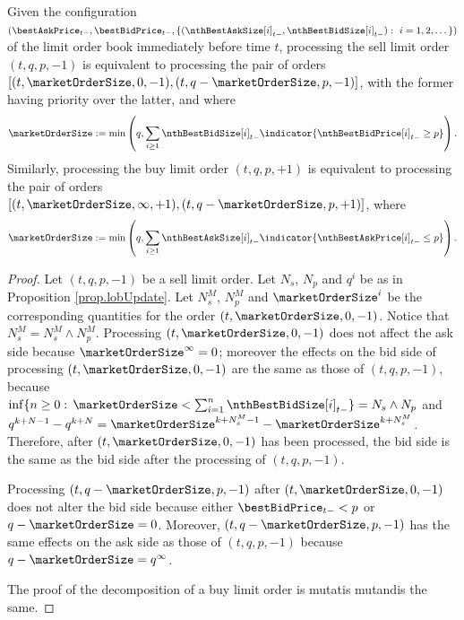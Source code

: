\begin{prop}
\label{prop.decompositionOfLimitOrder}
 Given the configuration
 $(\bestAskPrice_{t-}, \bestBidPrice_{t-},\lbrace (\nthBestAskSize[i]_{t-}, \nthBestBidSize[i]_{t-}) : \, \, i=1,2,\dots\rbrace )$
 of the limit order book immediately before time $t$,
 processing the sell limit order $(t,q,p,-1)$ is equivalent to processing the pair of orders
 $[(t,\marketOrderSize,0,-1),(t,q-\marketOrderSize,p,-1) ]$,
 with the former having priority over the latter, and where
 \begin{equation*}
  \marketOrderSize:= \min\left(q, \sum_{i\geq 1} \nthBestBidSize[i]_{t-} \indicator{\nthBestBidPrice[i]_{t-}\geq p}\right).
 \end{equation*}
Similarly, processing the buy limit order $(t,q,p,+1)$ is equivalent to processing the pair of orders
$[(t,\marketOrderSize,\infty,+1),(t,q-\marketOrderSize,p,+1) ]$, where
 \begin{equation*}
  \marketOrderSize:= \min\left (q, \sum_{i\geq 1} \nthBestAskSize[i]_{t-} \indicator{\nthBestAskPrice[i]_{t-}\leq  p}\right).
 \end{equation*}
\end{prop}
\begin{proof}
 Let $(t,q,p,-1)$ be a sell limit order.
 Let $N_s$, $N_p$ and $q^i$ be as in Proposition \ref{prop.lobUpdate}.
 Let $N_s^M$, $N_p^M$ and $\marketOrderSize^{i}$ be the corresponding quantities
 for the order $(t,\marketOrderSize,0,-1)$.
 Notice that $N_s^M = N_s^M \wedge N_p^M$.
 Processing $(t,\marketOrderSize,0,-1)$ does not affect the ask side
 because $\marketOrderSize^{\infty} = 0$;
 moreover the effects on the bid side of processing $(t,\marketOrderSize,0,-1)$
 are the same as those of $(t,q,p,-1)$,
 because $\inf \lbrace n\geq 0 : \, \marketOrderSize < \sum_{i=1}^{n} \nthBestBidSize[i]_{t-} \rbrace = N_s \wedge N_p$
 and $q^{k+N-1} - q^{k+N} = \marketOrderSize^{k+N_s^M - 1} - \marketOrderSize^{k+N_s^M}$.
 Therefore, after $(t,\marketOrderSize,0,-1)$ has been processed,
 the bid side is the same as the bid side after the processing of $(t,q,p,-1)$.

 Processing $(t,q-\marketOrderSize,p,-1)$ after $(t,\marketOrderSize,0,-1)$
 does not alter the bid side because either $\bestBidPrice_{t-} < p$ or $q-\marketOrderSize=0$.
 Moreover, $(t,q-\marketOrderSize,p,-1)$ has the same effects on the ask side
 as those of $(t,q,p,-1)$ because $q-\marketOrderSize = q^{\infty}$.

 The proof of the decomposition of a buy limit order is mutatis mutandis the same.
\end{proof}


